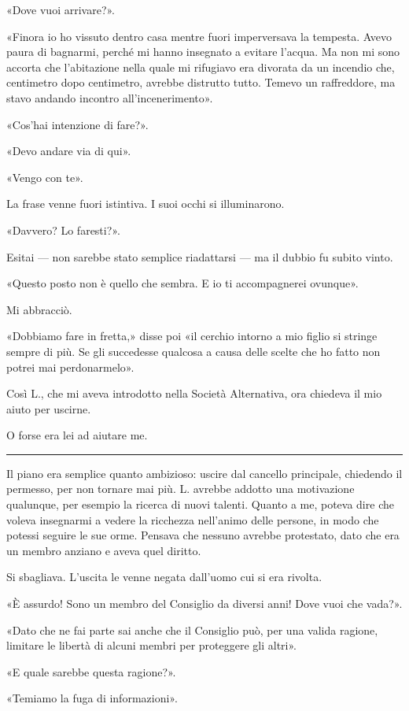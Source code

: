 \documentclass[a4paper,11pt,oneside,openright,final]{memoir}
\begin{document}
«Dove vuoi arrivare?».

«Finora io ho vissuto dentro casa mentre fuori imperversava la tempesta. Avevo
paura di bagnarmi, perché mi hanno insegnato a evitare l'acqua. Ma non mi sono
accorta che l'abitazione nella quale mi rifugiavo era divorata da un incendio
che, centimetro dopo centimetro, avrebbe distrutto tutto. Temevo un raffreddore,
ma stavo andando incontro all'incenerimento».

«Cos'hai intenzione di fare?».

«Devo andare via di qui».

«Vengo con te».

La frase venne fuori istintiva. I suoi occhi si illuminarono.

«Davvero? Lo faresti?».

Esitai --- non sarebbe stato semplice riadattarsi --- ma il dubbio fu subito
vinto.

«Questo posto non è quello che sembra. E io ti accompagnerei ovunque».

Mi abbracciò.

«Dobbiamo fare in fretta,» disse poi «il cerchio intorno a mio figlio si stringe
sempre di più. Se gli succedesse qualcosa a causa delle scelte che ho fatto non
potrei mai perdonarmelo».

Così L., che mi aveva introdotto nella Società Alternativa, ora chiedeva il mio
aiuto per uscirne.

O forse era lei ad aiutare me.

\plainbreak{1}

Il piano era semplice quanto ambizioso: uscire dal cancello principale,
chiedendo il permesso, per non tornare mai più. L. avrebbe addotto una
motivazione qualunque, per esempio la ricerca di nuovi talenti. Quanto a me,
poteva dire che voleva insegnarmi a vedere la ricchezza nell'animo delle
persone, in modo che potessi seguire le sue orme. Pensava che nessuno avrebbe
protestato, dato che era un membro anziano e aveva quel diritto.

Si sbagliava. L'uscita le venne negata dall'uomo cui si era rivolta.

«È assurdo! Sono un membro del Consiglio da diversi anni! Dove vuoi che vada?».

«Dato che ne fai parte sai anche che il Consiglio può, per una valida ragione,
limitare le libertà di alcuni membri per proteggere gli altri».

«E quale sarebbe questa ragione?».

«Temiamo la fuga di informazioni».
\end{document}
